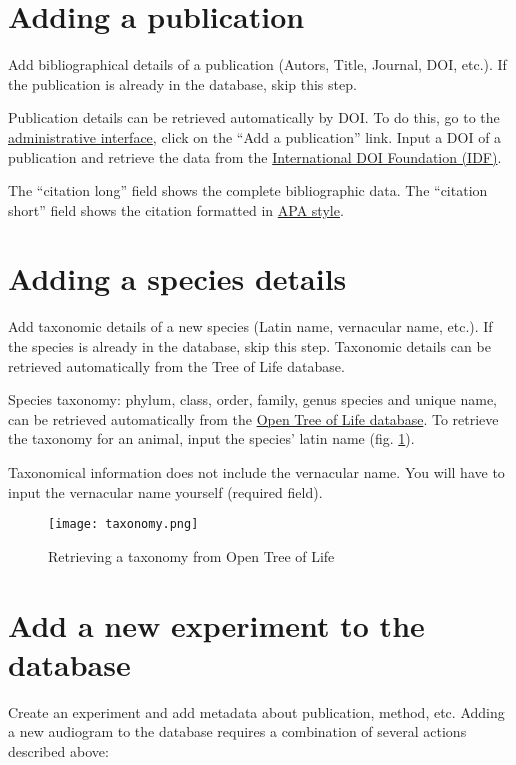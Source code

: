 \documentclass{article}
\begin{document}
\section{Adding a publication}
Add bibliographical details of a publication (Autors, Title, Journal, DOI, etc.). If the publication is already in the database, skip this step.

Publication details can be retrieved automatically by DOI. To do this, go to the \href{https://animalaudiograms.museumfuernaturkunde.berlin/admin/v1/start}{administrative interface}, click on the ``Add a publication'' link. Input a DOI of a publication and retrieve the data from the \href{https://www.doi.org/}{International DOI Foundation (IDF)}.

The ``citation long'' field shows the complete bibliographic data. The ``citation short'' field shows the citation formatted in \href{https://apastyle.apa.org}{APA style}.

\section{Adding a species details}
Add taxonomic details of a new species (Latin name, vernacular name, etc.). If the species is already in the database, skip this step. Taxonomic details can be retrieved automatically from the Tree of Life database.

Species taxonomy: phylum, class, order, family, genus species and unique name, can be retrieved automatically from the \href{https://opentreeoflife.github.io}{Open Tree of Life database}. To retrieve the taxonomy for an animal, input the species' latin name (fig. \ref{fig:taxonomy}).

Taxonomical information does not include the vernacular name. You will have to input the vernacular name yourself (required field).

\begin{figure}
\texttt{[image: taxonomy.png]}
\caption{Retrieving a taxonomy from Open Tree of Life}
\label{fig:taxonomy}
\end{figure}

\section{Add a new experiment to the database}
Create an experiment and add metadata about publication, method, etc.
Adding a new audiogram to the database requires a combination of several actions described above:
\end{document}
